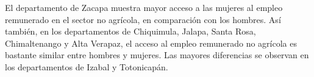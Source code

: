  El departamento de Zacapa muestra mayor acceso a las mujeres al empleo remunerado en el sector no agrícola, en comparación con los hombres. Así también, en los departamentos de Chiquimula, Jalapa, Santa Rosa, Chimaltenango y Alta Verapaz, el acceso al empleo remunerado no agrícola es bastante similar entre hombres y mujeres. Las mayores diferencias se observan en los departamentos de Izabal y Totonicapán.